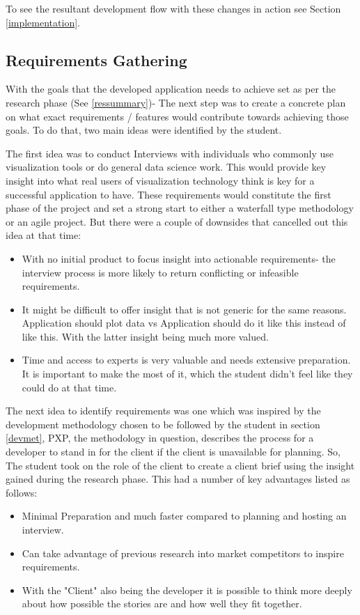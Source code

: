 To see the resultant development flow with these changes in action see Section \ref{implementation}.

\subsection{Requirements Gathering}
With the goals that the developed application needs to achieve set as per the research phase (See \ref{ressummary})- The next step was to create a concrete plan on what exact requirements / features would contribute towards achieving those goals. To do that, two main ideas were identified by the student.

The first idea was to conduct Interviews with individuals who commonly use visualization tools or do general data science work. This would provide key insight into what real users of visualization technology think is key for a successful application to have. These requirements would constitute the first phase of the project and set a strong start to either a waterfall type methodology or an agile project.
But there were a couple of downsides that cancelled out this idea at that time:
\begin{itemize}
    \item With no initial product to focus insight into actionable requirements- the interview process is more likely to return conflicting or infeasible requirements.
    \item It might be difficult to offer insight that is not generic for the same reasons. Application should plot data vs Application should do it like this instead of like this. With the latter insight being much more valued.
    \item Time and access to experts is very valuable and needs extensive preparation. It is important to make the most of it, which the student didn’t feel like they could do at that time.
\end{itemize}

The next idea to identify requirements was one which was inspired by the development methodology chosen to be followed by the student in section \ref{devmet}, PXP, the methodology in question, describes the process for a developer to stand in for the client if the client is unavailable for planning. So, The student took on the role of the client to create a client brief using the insight gained during the research phase. This had a number of key advantages listed as follows:

\begin{itemize}
    \item Minimal Preparation and much faster compared to planning and hosting an interview.
    \item Can take advantage of previous research into market competitors to inspire requirements.
    \item With the "Client" also being the developer it is possible to think more deeply about how possible the stories are and how well they fit together.
\end{itemize}

